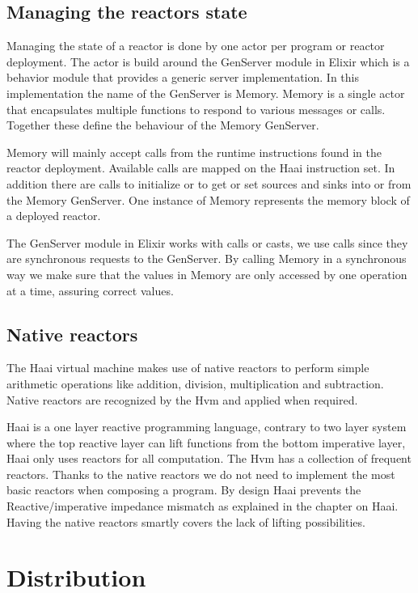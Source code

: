 \documentclass[a4paper]{book}
\begin{document}
\section{Managing the reactors state}
Managing the state of a reactor is done by one actor per program or reactor deployment. The actor is build around the GenServer module in Elixir which is a behavior module that provides a generic server implementation. In this implementation the name of the GenServer is Memory. Memory is a single actor that encapsulates multiple functions to respond to various messages or calls. Together these define the behaviour of the Memory GenServer.

Memory will mainly accept calls from the runtime instructions found in the reactor deployment. Available calls are mapped on the Haai instruction set. In addition there are calls to initialize or to get or set sources and sinks into or from the Memory GenServer. One instance of Memory represents the memory block of a deployed reactor.

The GenServer module in Elixir works with calls or casts, we use calls since they are synchronous requests to the GenServer. By calling Memory in a synchronous way we make sure that the values in Memory are only accessed by one operation at a time, assuring correct values. 

\section{Native reactors}
The Haai virtual machine makes use of native reactors to perform simple arithmetic operations like addition, division, multiplication and subtraction. Native reactors are recognized by the Hvm and applied when required.

Haai is a one layer reactive programming language, contrary to two layer system where the top reactive layer can lift functions from the bottom imperative layer, Haai only uses reactors for all computation. The Hvm has a collection of frequent reactors. Thanks to the native reactors we do not need to implement the most basic reactors when composing a program. By design Haai prevents the Reactive/imperative impedance mismatch as explained in the chapter on Haai. Having the native reactors smartly covers the lack of lifting possibilities.

\chapter{Distribution}
\end{document}

